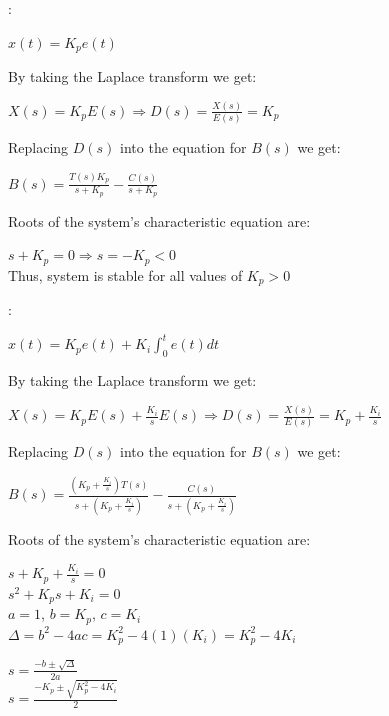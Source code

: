 \documentclass{article}
\begin{document}
\begin{enumerate}
\begin{itemize}
\bigbreak \bigbreak

: \smallbreak

\noindent $x(t) = K_p e(t)$ \bigbreak

\noindent By taking the Laplace transform we get: \smallbreak

\noindent $X(s) = K_p E(s) \Rightarrow D(s) = {\frac{X(s)}{E(s)}}
= K_p$ \bigbreak

\noindent Replacing $D(s)$ into the equation for $B(s)$ we get:
\smallbreak

\noindent $B(s) = {\frac{T(s) K_p}{s + K_p}} - {\frac{C(s)}{s +
K_p}}$ \bigbreak

\noindent Roots of the system's characteristic equation are:
\smallbreak

\noindent $s + K_p = 0 \Rightarrow s = -K_p < 0$\\
\noindent Thus, system is stable for all values of $K_p > 0$

\bigbreak \bigbreak

: \smallbreak

\noindent $x(t) = K_p e(t) + K_i \int^t_0 e(t) dt$ \bigbreak

\noindent By taking the Laplace transform we get: \smallbreak

\noindent $X(s) = K_p E(s) + {\frac{K_i}{s}} E(s) \Rightarrow D(s)
= {\frac{X(s)}{E(s)}} = K_p + {\frac{K_i}{s}}$ \bigbreak

\noindent Replacing $D(s)$ into the equation for $B(s)$ we get:
\smallbreak

\noindent $B(s) = {\frac{(K_p + {\frac{K_i}{s}}) T(s)}{s + (K_p +
{\frac{K_i}{s}})}} - {\frac{C(s)}{s + (K_p + {\frac{K_i}{s}})}}$
\bigbreak

\noindent Roots of the system's characteristic equation are:
\smallbreak

\noindent $s + K_p + {\frac{K_i}{s}} = 0$\\
\noindent $s^2 + K_ps + K_i = 0$\\
\noindent $a = 1$, $b = K_p$, $c = K_i$\\
\noindent $\Delta = b^2 - 4ac = K_p^2 - 4(1)(K_i) = K_p^2 - 4 K_i$
\bigbreak

\noindent $s = {\frac{-b \pm \sqrt{\Delta}}{2a}}$\\

\noindent $s = {\frac{-K_p \pm \sqrt{K_p^2 - 4K_i}}{2}}$\\


\end{itemize}
\end{enumerate}
\end{document}
